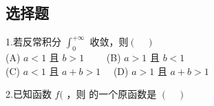 
\subsection{选择题}
1.若反常积分 $\int_{0}^{+\infty}$ 收敛，则$(\quad)$\\
(A) $a<1$ 且 $b>1 \qquad$
(B) $a>1$ 且 $b<1$\\
(C) $a<1$ 且 $a+b>1 \quad$
(D) $a>1$ 且 $a+b>1$

 2.已知函数 $f($ ，则  的一个原函数是  $(\quad)$